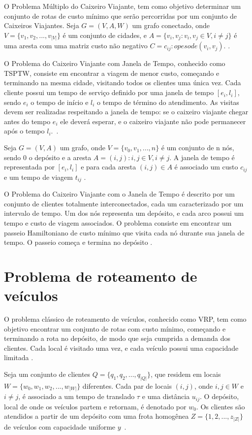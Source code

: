 O Problema Múltiplo do Caixeiro Viajante, tem como objetivo determinar um conjunto de rotas de custo mínimo que serão percorridas por um conjunto de Caixeiros Viajantes.
Seja $G = (V,A,W)$ um grafo conectado, onde $V = \{v_1, v_2, ..., v_{|V|}\}$ é um conjunto de cidades, e $A = \{ v_i,v_j: v_i,v_j \in V, i \neq j\}$ é uma aresta com uma matriz custo não negativo $C = {c_{ij}: o peso de (v_i,v_j)}$. \cite{meng:2012}. 

O Problema do Caixeiro Viajante com Janela de Tempo, conhecido como \ac{TSPTW}, consiste em encontrar a viagem de menor custo, começando e terminando na mesma cidade, visitando todos os clientes uma única vez. Cada cliente possui um tempo de serviço definido por uma janela de tempo $[e_{i}, l_{i}]$, sendo $e_{i}$ o tempo de início e $l_{i}$ o tempo de término do atendimento. As visitas devem ser realizadas respeitando a janela de tempo: se o caixeiro viajante chegar antes do tempo $e_{i}$ ele deverá esperar, e o caixeiro viajante não pode permanecer após o tempo $l_{i}$.~\cite{urrutia:2010}.  

Seja $G=(V,A)$ um grafo, onde $V = \{v_0, v_1, ..., n \}$ é um conjunto de n nós, sendo $0$ o depósito e a aresta $A = {(i,j): i,j \in V, i \neq j}$. A janela de tempo é representada por $[e_i, l_i]$ e para cada aresta $(i,j) \in A$ é associado um custo $c_{ij}$ e um tempo de viagem $t_{ij}$ \cite{calvo:2000}.

O Problema do Caixeiro Viajante com o Janela de Tempo é descrito por um conjunto de clientes totalmente interconectados, cada um caracterizado por um intervalo de tempo. Um dos nós representa um depósito, e cada arco possui um tempo e custo de viagem associados. O problema consiste em encontrar um passeio Hamiltoniano de custo mínimo que visita cada nó durante sua janela de tempo. O passeio começa e termina no depósito \cite{calvo:2000}.

\section{Problema de roteamento de veículos}

O problema clássico de roteamento de veículos, conhecido como \ac{VRP}, tem como objetivo encontrar um conjunto de rotas com custo mínimo, começando e terminando a rota no depósito, de modo que seja cumprida a demanda dos clientes. Cada local é visitado uma vez, e cada veículo possui uma capacidade limitada \cite{gold:2008}.

Seja um conjunto de clientes $Q = \{q_1, q_2, ..., q_{|Q|}\}$, que residem em locais $W = \{w_0, w_1, w_2, ..., w_{|W|}\}$ diferentes. Cada par de locais $(i,j)$, onde  $i,j \in W$ e $i \neq j$, é associado a um tempo de translado $\tau$ e uma distância $u_{ij}$. O depósito, local de onde os veículos partem e retornam, é denotado por $w_0$.
Os clientes são atendidos a partir de um depósito com uma frota  homogênea $Z = \{1, 2, ..., z_{|Z|}\}$ de veículos com capacidade uniforme $y$~\cite{gold:2008}.


